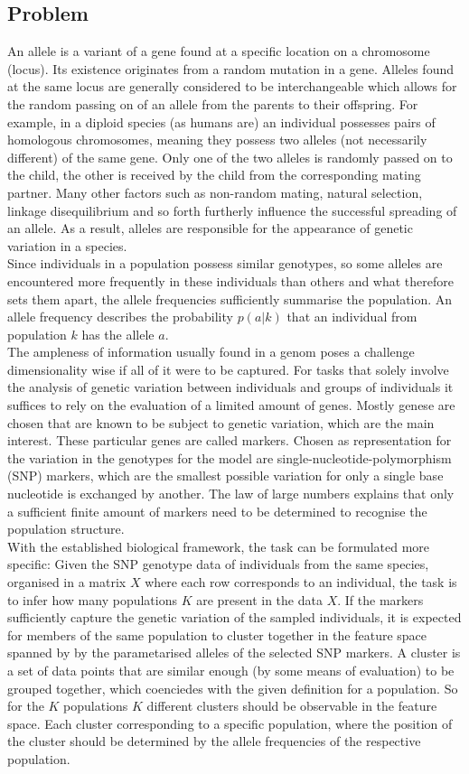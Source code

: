 \documentclass[a4paper, 11pt]{article}
\begin{document}
\subsection{Problem}
An allele is a variant of a gene found at a specific location on a chromosome (locus). Its existence originates from a random mutation in a gene. Alleles found at the same locus are generally considered to be interchangeable which allows for the random passing on of an allele from the parents to their offspring. For example, in a diploid species (as humans are) an individual possesses pairs of homologous chromosomes, meaning they possess two alleles (not necessarily different) of the same gene. Only one of the two alleles is randomly passed on to the child, the other is received by the child from the corresponding mating partner. Many other factors such as non-random mating, natural selection, linkage disequilibrium and so forth furtherly influence the successful spreading of an allele. As a result, alleles are responsible for the appearance of genetic variation in a species.\\
Since individuals in a population possess similar genotypes, so some alleles are encountered more frequently in these individuals than others and what therefore sets them apart, the allele frequencies sufficiently summarise the population. An allele frequency describes the probability $p(a | k)$ that an individual from population $k$ has the allele $a$. \\
The ampleness of information usually found in a genom poses a challenge dimensionality wise if all of it were to be captured. For tasks that solely involve the analysis of genetic variation between individuals and groups of individuals it suffices to rely on the evaluation of a limited amount of genes. Mostly genese are chosen that are known to be subject to genetic variation, which are the main interest. These particular genes are called markers. Chosen as representation for the variation in the genotypes for the model are single-nucleotide-polymorphism (SNP) markers, which are the smallest possible variation for only a single base nucleotide is exchanged by another. The law of large numbers explains that only a sufficient finite amount of markers need to be determined to recognise the population structure. \\
With the established biological framework, the task can be formulated more specific: Given the SNP genotype data of individuals from the same species, organised in a matrix $X$ where each row corresponds to an individual, the task is to infer how many populations $K$ are present in the data $X$. If the markers sufficiently capture the genetic variation of the sampled individuals, it is expected for members of the same population to cluster together in the feature space spanned by by the parametarised alleles of the selected SNP markers. A cluster is a set of data points that are similar enough (by some means of evaluation) to be grouped together, which coenciedes with the given definition for a population. So for the $K$ populations $K$ different clusters should be observable in the feature space. Each cluster corresponding to a specific population, where the position of the cluster should be determined by the allele frequencies of the respective population.
\end{document}
